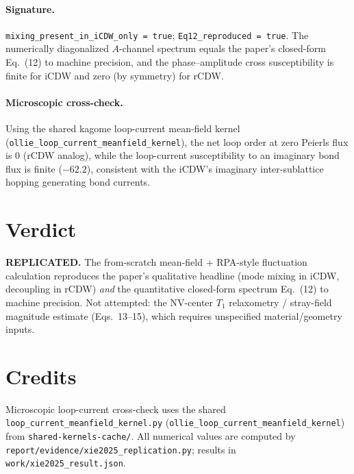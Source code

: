 \documentclass[11pt]{article}
\begin{document}
\paragraph{Signature.} \verb|mixing_present_in_iCDW_only = true|;
\verb|Eq12_reproduced = true|. The numerically diagonalized $A$-channel spectrum
equals the paper's closed-form Eq.~(12) to machine precision, and the
phase--amplitude cross susceptibility is finite for iCDW and zero (by symmetry)
for rCDW.

\paragraph{Microscopic cross-check.} Using the shared kagome loop-current
mean-field kernel (\texttt{ollie\_loop\_current\_meanfield\_kernel}), the net
loop order at zero Peierls flux is $0$ (rCDW analog), while the loop-current
susceptibility to an imaginary bond flux is finite ($-62.2$), consistent with the
iCDW's imaginary inter-sublattice hopping generating bond currents.

\section{Verdict}
\textbf{REPLICATED.} The from-scratch mean-field + RPA-style fluctuation
calculation reproduces the paper's qualitative headline (mode mixing in iCDW,
decoupling in rCDW) \emph{and} the quantitative closed-form spectrum Eq.~(12) to
machine precision. Not attempted: the NV-center $T_1$ relaxometry / stray-field
magnitude estimate (Eqs.~13--15), which requires unspecified material/geometry
inputs.

\section*{Credits}
Microscopic loop-current cross-check uses the shared
\texttt{loop\_current\_meanfield\_kernel.py}
(\texttt{ollie\_loop\_current\_meanfield\_kernel}) from
\texttt{shared-kernels-cache/}. All numerical values are computed by
\texttt{report/evidence/xie2025\_replication.py}; results in
\texttt{work/xie2025\_result.json}.
\end{document}
